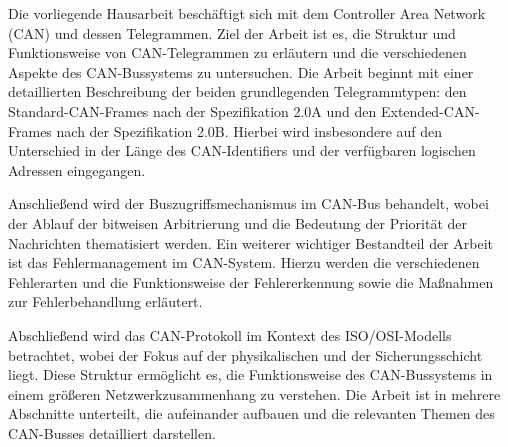 
Die vorliegende Hausarbeit beschäftigt sich mit dem Controller Area Network (CAN) und dessen Telegrammen. Ziel der Arbeit ist es, die Struktur und Funktionsweise von CAN-Telegrammen zu erläutern und die verschiedenen Aspekte des CAN-Bussystems zu untersuchen. Die Arbeit beginnt mit einer detaillierten Beschreibung der beiden grundlegenden Telegrammtypen: den Standard-CAN-Frames nach der Spezifikation 2.0A und den Extended-CAN-Frames nach der Spezifikation 2.0B. Hierbei wird insbesondere auf den Unterschied in der Länge des CAN-Identifiers und der verfügbaren logischen Adressen eingegangen.

Anschließend wird der Buszugriffsmechanismus im CAN-Bus behandelt, wobei der Ablauf der bitweisen Arbitrierung und die Bedeutung der Priorität der Nachrichten thematisiert werden. Ein weiterer wichtiger Bestandteil der Arbeit ist das Fehlermanagement im CAN-System. Hierzu werden die verschiedenen Fehlerarten und die Funktionsweise der Fehlererkennung sowie die Maßnahmen zur Fehlerbehandlung erläutert.

Abschließend wird das CAN-Protokoll im Kontext des ISO/OSI-Modells betrachtet, wobei der Fokus auf der physikalischen und der Sicherungsschicht liegt. Diese Struktur ermöglicht es, die Funktionsweise des CAN-Bussystems in einem größeren Netzwerkzusammenhang zu verstehen. Die Arbeit ist in mehrere Abschnitte unterteilt, die aufeinander aufbauen und die relevanten Themen des CAN-Busses detailliert darstellen.
